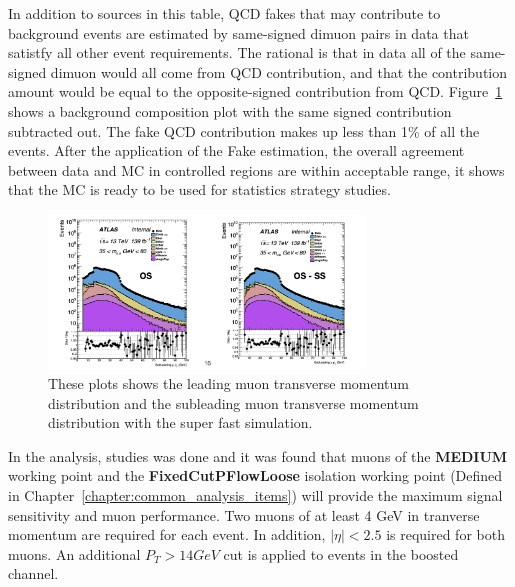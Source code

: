 In addition to sources in this table, QCD fakes that may contribute to background events are estimated by same-signed dimuon pairs in data that satistfy all other event requirements. The rational is that in data all of the same-signed dimuon would all come from QCD contribution, and that the contribution amount would be equal to the opposite-signed contribution from QCD. Figure~\ref{fig:samesigned} shows a background composition plot with the same signed contribution subtracted out. The fake QCD contribution makes up less than 1\% of all the events. After the application of the Fake estimation, the overall agreement between data and MC in controlled regions are within acceptable range, it shows that the MC is ready to be used for statistics strategy studies.

\begin{figure}[!htb]
    \begin{center}
        \includegraphics[width=0.75\textwidth]{figures/chapter_dimuon/samesigned}
        \caption{
        These plots shows the leading muon transverse momentum distribution and the subleading muon transverse momentum distribution with the super fast simulation.  }
        \label{fig:samesigned}
    \end{center}
\end{figure}

In the analysis, studies was done and it was found that muons of the \textbf{MEDIUM} working point and the \textbf{FixedCutPFlowLoose} isolation working point (Defined in Chapter~\ref{chapter:common_analysis_items}) will provide the maximum signal sensitivity and muon performance. Two muons of at least 4 GeV in tranverse momentum are required for each event. In addition, $|\eta|< 2.5$ is required for both muons. An additional $P_{T}> 14GeV$ cut is applied to events in the boosted channel.

